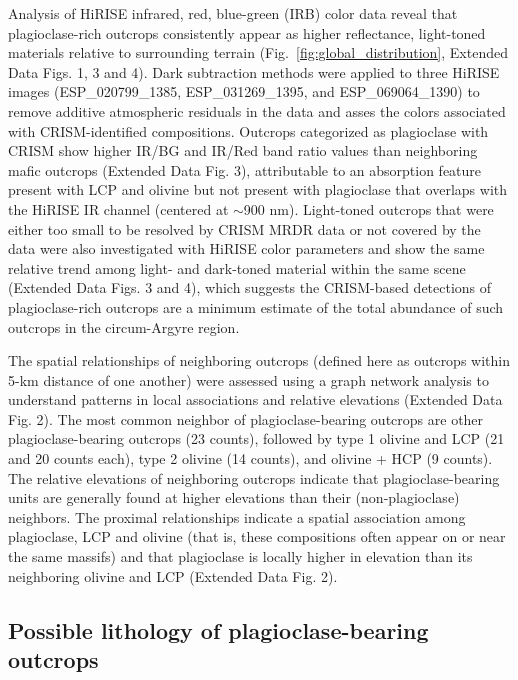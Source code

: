 \documentclass[11pt]{article}
\begin{document}
Analysis of HiRISE infrared, red, blue-green (IRB) color data reveal that plagioclase-rich outcrops consistently appear as higher reflectance, light-toned materials relative to surrounding terrain (Fig.~\ref{fig:global_distribution}, Extended Data Figs. 1, 3 and 4). Dark subtraction methods \citep{Tornabene2018} were applied to three HiRISE images (ESP\_020799\_1385, ESP\_031269\_1395, and ESP\_069064\_1390) to remove additive atmospheric residuals in the data and asses the colors associated with CRISM-identified compositions. Outcrops categorized as plagioclase with CRISM show higher IR/BG and IR/Red band ratio values than neighboring mafic outcrops (Extended Data Fig. 3), attributable to an absorption feature present with LCP and olivine but not present with plagioclase that overlaps with the HiRISE IR channel (centered at $\sim$900 nm). Light-toned outcrops that were either too small to be resolved by CRISM MRDR data or not covered by the data were also investigated with HiRISE color parameters and show the same relative trend among light- and dark-toned material within the same scene (Extended Data Figs. 3 and 4), which suggests the CRISM-based detections of plagioclase-rich outcrops are a minimum estimate of the total abundance of such outcrops in the circum-Argyre region.

The spatial relationships of neighboring outcrops (defined here as outcrops within 5-km distance of one another) were assessed using a graph network analysis to understand patterns in local associations and relative elevations (Extended Data Fig. 2). The most common neighbor of plagioclase-bearing outcrops are other plagioclase-bearing outcrops (23 counts), followed by type 1 olivine and LCP (21 and 20 counts each), type 2 olivine (14 counts), and olivine + HCP (9 counts). The relative elevations of neighboring outcrops indicate that plagioclase-bearing units are generally found at higher elevations than their (non-plagioclase) neighbors. The proximal relationships indicate a spatial association among plagioclase, LCP and olivine (that is, these compositions often appear on or near the same massifs) and that plagioclase is locally higher in elevation than its neighboring olivine and LCP (Extended Data Fig. 2).

\subsection*{Possible lithology of plagioclase-bearing outcrops}
\end{document}
